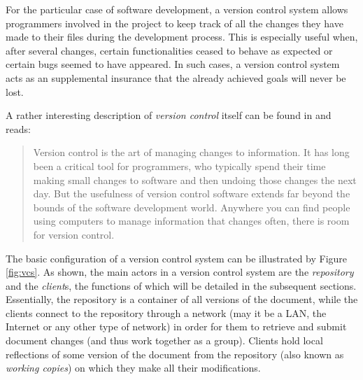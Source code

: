 For the particular case of software development, a version control system allows
programmers involved in the project to keep track of all the changes they have made
to their files during the development process. This is especially useful when, after
several changes, certain functionalities ceased to behave as expected
or certain bugs seemed to have appeared. In such cases, a version control system
acts as an supplemental insurance that the already achieved goals will never be
lost.

A rather interesting description of \emph{version control} itself can be found
in \cite{collins04} and reads:
\begin{quote}
Version control is the art of managing changes to information. It has long been a critical
tool for programmers, who typically spend their time making small changes to software and
then undoing those changes the next day. But the usefulness of version control software extends
far beyond the bounds of the software development world. Anywhere you can find people using
computers to manage information that changes often, there is room for version control.
\end{quote}

The basic configuration of a version control system can be illustrated by Figure \ref{fig:vcs}.
As shown, the main actors in a version control system are the \emph{repository} and the
\emph{client}s, the functions of which will be detailed in the subsequent sections. Essentially,
the repository is a container of all versions of the document, while the clients connect
to the repository through a network (may it be a LAN, the Internet or any other type of network)
in order for them to retrieve and submit document changes (and thus work together as a group).
Clients hold local reflections of some version of the document from the repository (also
known as \emph{working copies}) on which they make all their modifications.

